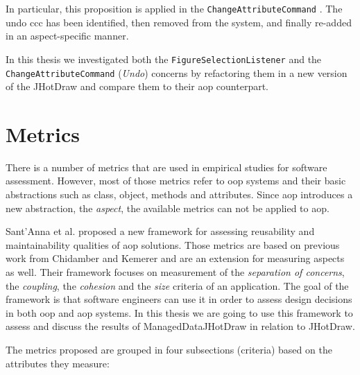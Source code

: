 In particular, this proposition is applied in the \texttt{ChangeAttributeCommand} \cite{marin2004refactoring}.
The undo \ac{ccc} has been identified, then removed from the system, and finally re-added in an aspect-specific manner.

In this thesis we investigated both the \texttt{FigureSelectionListener} and the \texttt{ChangeAttributeCommand} (\textit{Undo}) concerns by refactoring them in a new version of the JHotDraw and compare them to their \ac{aop} counterpart.

\section{Metrics}\label{Background Metrics}
There is a number of metrics that are used in empirical studies for software assessment. 
However, most of those metrics refer to \ac{oop} systems \cite{chidamber1994metrics} and their basic abstractions such as class, object, methods and attributes.
Since \ac{aop} introduces a new abstraction, the \textit{aspect}, the available metrics can not be applied to \ac{aop}.

Sant'Anna et al. \cite{sant2003reuse} proposed a new framework for assessing reusability and maintainability qualities of \ac{aop} solutions.
Those metrics are based on previous work from Chidamber and Kemerer \cite{chidamber1994metrics} and are an extension for measuring aspects as well.
Their framework focuses on measurement of the \textit{separation of concerns}, the \textit{coupling}, the \textit{cohesion} and the \textit{size} criteria of an application.
The goal of the framework is that software engineers can use it in order to assess design decisions in both \ac{oop} and \ac{aop} systems.
In this thesis we are going to use this framework to assess and discuss the results of ManagedDataJHotDraw in relation to JHotDraw.

The metrics proposed \cite{sant2003reuse} are grouped in four subsections (criteria) based on the attributes they measure:

